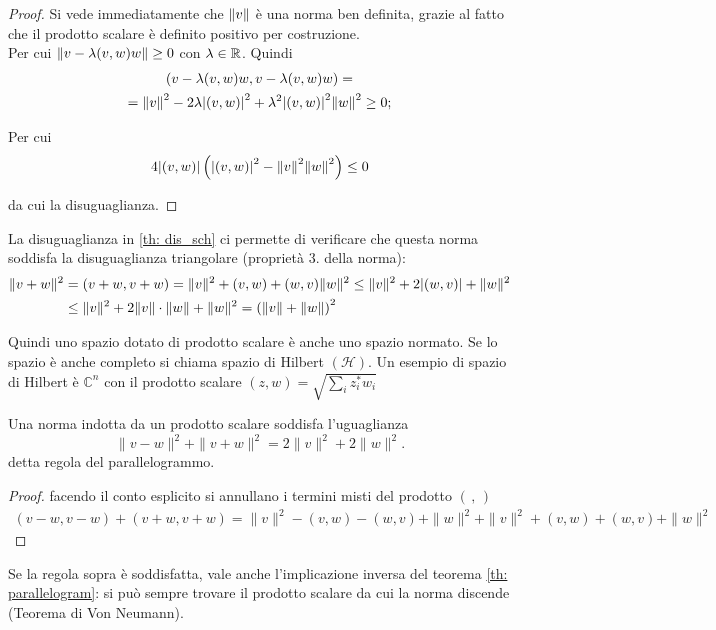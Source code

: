 \begin{proof}
Si vede immediatamente che ${\|v\|}$ è una norma ben definita, grazie al
fatto che il prodotto scalare è definito positivo per costruzione. \\
Per cui ${\|v - \lambda(v,w)w\|} \geq 0$ con $\lambda \in \mathbb R$. 
Quindi
\begin{gather*}
(v - \lambda(v,w)w,v - \lambda(v,w)w) = \\
={\|v\|}^2 - 2\lambda{\left|(v,w)\right|}^2 +\lambda^2 {\left|(v,w)\right|}^2 {\|w\|}^2 \geq 0 ;
\end{gather*}

Per cui
\begin{align*}
4{\left|(v,w)\right|}\left({\left|(v,w)\right|}^2 - {\|v\|}^2 {\|w\|}^2\right) \leq 0
\end{align*}

da cui la disuguaglianza.
\end{proof}
\begin{remark}
La disuguaglianza in \ref{th: dis_sch} ci permette di verificare che questa
norma soddisfa la disuguaglianza triangolare (proprietà $3.$ della norma):
\begin{align*}
\|v + w\|^2 &= (v + w, v + w) = \|v\|^2 + (v, w) + (w, v) \|w\|^2 
\leq \|v\|^2 + 2 {\left|(w, v)\right|} + \|w\|^2 \\
&\leq \|v\|^2 + 2 \|v\| \cdot \|w\| + \|w\|^2 = \left( \|v\| + \|w\| \right)^2
\end{align*}
\end{remark}
Quindi uno spazio dotato di prodotto scalare è anche uno spazio normato.
Se lo spazio è anche completo si chiama spazio di Hilbert
$\left(\mathcal{H}\right)$. Un esempio di spazio di Hilbert è $\mathbb{C}^n$
con il prodotto scalare $(z,w) = \sqrt{\sum_i z_i^\ast w_i}$

\begin{theorem}\label{th: parallelogram}
Una norma indotta da un prodotto scalare soddisfa l'uguaglianza
\[
\|v - w\|^2 + \|v + w\|^2 = 2\|v\|^2 + 2\|w\|^2
.\]
detta regola del parallelogrammo.
\end{theorem}
\begin{proof}
facendo il conto esplicito si annullano i termini misti del prodotto $(\, ,\,)$
\begin{align*}
	(v - w, v - w) + (v + w, v + w) = \|v\|^2 - (v, w) - (w, v) + \|w\|^2
	+ \|v\|^2 + (v, w) + (w, v) + \|w\|^2	
\end{align*}
\end{proof}

\begin{remark}
Se la regola sopra è soddisfatta, vale anche l'implicazione inversa del teorema
\ref{th: parallelogram}: si può sempre trovare il prodotto scalare da cui la
norma discende (Teorema di Von Neumann).
\end{remark}
